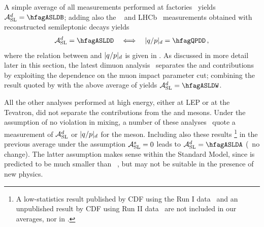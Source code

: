 A simple average of all measurements performed at 
\B factories~\cite{Behrens:2000qu,Jaffe:2001hz,*Jaffe:2001hz_cont,Aubert:2003hd,*Aubert:2004xga_mod_cont,Lees:2013sua,*Margoni:2013qx,*Aubert:2006sa_mod,Lees:2014qma,*Lees:2014qma_cont,Nakano:2005jb}
yields $\ASLd = \hfagASLDB$; adding also the \dzero~\cite{Abazov:2012uia}
and LHCb~\cite{Aaij:2014nxa} measurements obtained with reconstructed 
semileptonic \Bd decays yields
\begin{equation}
\ASLd = \hfagASLDD  ~~~ \Longleftrightarrow ~~~ |q/p|_{\particle{d}} = \hfagQPDD \,,
\labe{ASLDD}
\end{equation}
where the relation between \ASLd and $|q/p|_{d}$ is given in .
As discussed in more detail later in this section, 
the latest dimuon \dzero analysis~\cite{Abazov:2013uma,*Abazov:2011yk_mod,*Abazov:2010hv_mod_cont,*Abazov:2010hj_mod_cont,*Abazov:2011yk_cont}
separates the \Bd and \Bs contributions by exploiting the dependence on the muon impact parameter cut; combining the 
\ASLd result quoted by \dzero with the above \Bd average of  yields
$\ASLd = \hfagASLDW$. %

All the other \Bd analyses performed at high energy, either at LEP or at the Tevatron,
did not separate the contributions from the \Bd and \Bs mesons.
Under the assumption of no \CP violation in \Bs mixing, a number of 
these analyses~\cite{Abazov:2006qw,Ackerstaff:1997vd,Barate:2000uk,Abbiendi:1998av}
quote a measurement of ${\cal A}_{\rm SL}^d$ or $|q/p|_{d}$ for the \Bd meson. Including also 
these results%
\footnote{
  \label{foot:life_mix:Abe:1996zt}
  A low-statistics result published by CDF using the Run I data~\cite{Abe:1996zt} and 
an unpublished result by CDF using Run II data~\cite{CDFnote9015:2007} 
are not included in our averages, nor in .}
in the previous average %
under the assumption ${\cal A}_{\rm SL}^s =0$
leads to 
$\ASLd = \hfagASLDA$ %
(\ie\ no change).
The latter assumption makes sense within the Standard Model, 
since \ASLs is predicted to be much smaller than \ASLd~\cite{Lenz:2011ti,*Lenz:2006hd},
but may not be suitable in the presence of new physics. 

